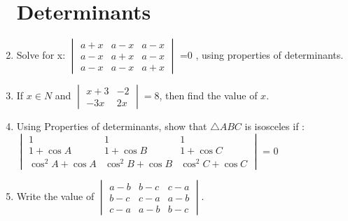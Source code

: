 \documentclass[12pt,-letter paper]{article}
\theoremstyle{remark}
\newcommand{\mydet}[1]{\ensuremath{\begin{vmatrix}#1\end{vmatrix}}}
\begin{document}
\begin{enumerate}
            \section{Determinants}
      \item Solve for x: \mydet{a+x & a-x &a-x\\a-x&a+x& a-x\\a-x & a-x & a+x} =0 , using properties of determinants.
      \item If $x \in N$ and $\mydet{x+3 & -2 \\ -3x & 2x} = 8$, then find the value of $x$.

      \item Using Properties of determinants, show that $\triangle ABC$ is isosceles if :\\
            \mydet{
                  1&1&1\\
                  1+\cos A & 1+ \cos B & 1+ \cos C\\
                  \cos^2 A + \cos A & \cos^2 B + \cos B & \cos^2 C + \cos C
            } = 0
      \item Write the value of
            \mydet{a-b & b-c & c-a \\
                  b-c & c-a & a-b\\
                  c-a & a-b & b-c
            }.

\end{enumerate}
\end{document}

